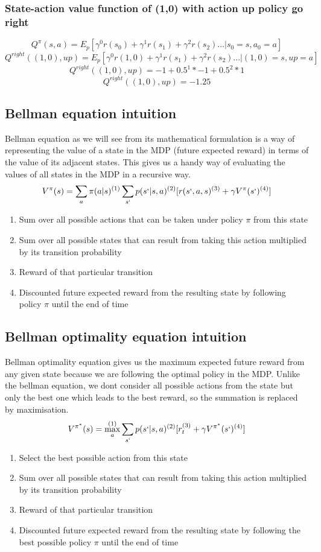 \documentclass[11pt]{article}
\begin{document}
\subsubsection{State-action value function of (1,0) with action up policy go right}
$$ Q^\pi(s,a) = E_p[\gamma^0r(s_0) + \gamma^1r(s_1) + \gamma^2r(s_2) ... | s_0 = s, a_0 = a]$$
$$ Q^{right}((1,0),up) = E_p[\gamma^0r(1,0) + \gamma^1r(s_1) + \gamma^2r(s_2) ... | (1,0) = s, up = a]$$
$$ Q^{right}((1,0),up) = -1 + 0.5^1*-1 +0.5^2*1$$
$$ Q^{right}((1,0),up) = -1.25$$

\subsection{Bellman equation intuition}
Bellman equation as we will see from its mathematical formulation is a way of representing the value of a state in the MDP (future expected reward) in terms of the value of its adjacent states. This gives us a handy way of evaluating the values of all states in the MDP in a recursive way.
$$ V^\pi(s) = \sum_a \pi(a|s)^{(1)} \sum_{s`} p(s`|s,a)^{(2)}[r(s`,a,s)^{(3)} + \gamma V^\pi(s`)^{(4)}] $$
\begin{enumerate}
    \item Sum over all possible actions that can be taken under policy $\pi$ from this state
    \item Sum over all possible states that can result from taking this action multiplied by its transition probability
    \item Reward of that particular transition
    \item Discounted future expected reward from the resulting state by following policy $\pi$ until the end of time
\end{enumerate}

\subsection{Bellman optimality equation intuition}
Bellman optimality equation gives us the maximum expected future reward from any given state because we are following the optimal policy in the MDP. Unlike the bellman equation, we dont consider all possible actions from the state but only the best one which leads to the best reward, so the summation is replaced by maximisation.
$$ V^{\pi^*}(s) = \max_a^{(1)} \sum_{s`} p(s`|s,a)^{(2)}[r_t^{(3)} + \gamma V^{\pi^*}(s`)^{(4)}] $$
\begin{enumerate}
    \item Select the best possible action from this state
    \item Sum over all possible states that can result from taking this action multiplied by its transition probability
    \item Reward of that particular transition
    \item Discounted future expected reward from the resulting state by following the best possible policy $\pi$ until the end of time
\end{enumerate}
\end{document}
